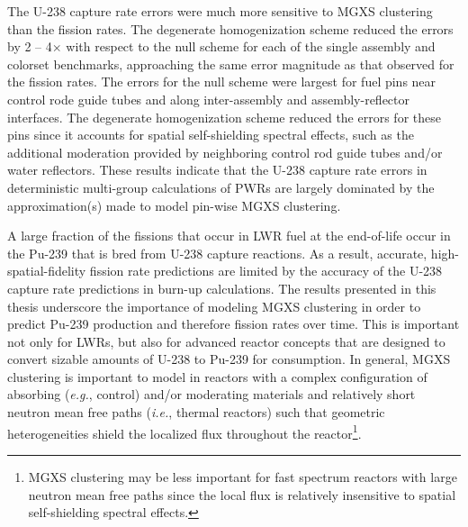 The U-238 capture rate errors were much more sensitive to \ac{MGXS} clustering than the fission rates. The degenerate homogenization scheme reduced the errors by 2 -- 4$\times$ with respect to the null scheme for each of the single assembly and colorset benchmarks, approaching the same error magnitude as that observed for the fission rates. The errors for the null scheme were largest for fuel pins near control rode guide tubes and along inter-assembly and assembly-reflector interfaces. The degenerate homogenization scheme reduced the errors for these pins since it accounts for spatial self-shielding spectral effects, such as the additional moderation provided by neighboring control rod guide tubes and/or water reflectors. These results indicate that the U-238 capture rate errors in deterministic multi-group calculations of \acp{PWR} are largely dominated by the approximation(s) made to model pin-wise \ac{MGXS} clustering.

A large fraction of the fissions that occur in \ac{LWR} fuel at the end-of-life occur in the Pu-239 that is bred from U-238 capture reactions. As a result, accurate, high-spatial-fidelity fission rate predictions are limited by the accuracy of the U-238 capture rate predictions in burn-up calculations. The results presented in this thesis underscore the importance of modeling \ac{MGXS} clustering in order to predict Pu-239 production and therefore fission rates over time. This is important not only for \acp{LWR}, but also for advanced reactor concepts that are designed to convert sizable amounts of U-238 to Pu-239 for consumption. In general, \ac{MGXS} clustering is important to model in reactors with a complex configuration of absorbing (\textit{e.g.}, control) and/or moderating materials and relatively short neutron mean free paths (\textit{i.e.}, thermal reactors) such that geometric heterogeneities shield the localized flux throughout the reactor\footnote{\ac{MGXS} clustering may be less important for fast spectrum reactors with large neutron mean free paths since the local flux is relatively insensitive to spatial self-shielding spectral effects.}.



